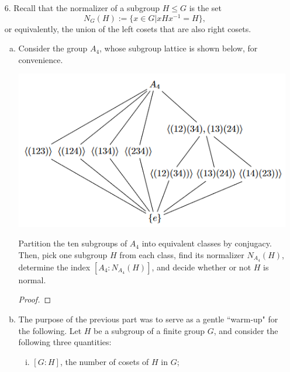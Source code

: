 \begin{itemize}
\begin{enumerate}[(a)]
\begin{enumerate}[(i)]
\begin{proof}
        \end{proof}
    \end{enumerate}
\end{enumerate}












\item[6.] Recall that the normalizer of a subgroup $H \leq G$ is the set
$$N_{G}(H) := \{x \in G | xHx^{-1} = H\},$$
or equivalently, the union of the left cosets that are also right cosets.
\begin{enumerate}[(a)]
\item Consider the group $A_4$, whose subgroup lattice is shown below, for
convenience.
\begin{center}
    \includegraphics[scale=0.5]{A4.png}
\end{center}

Partition the ten subgroups of $A_4$ into equivalent classes by conjugacy. Then,
pick one subgroup $H$ from each class, find its normalizer $N_{A_4}(H)$, determine the index $[A_4 : N_{A_4}(H)]$, and decide whether or not $H$ is normal.
\begin{proof}

\end{proof}

\item The purpose of the previous part was to serve as a gentle ``warm-up"
for the following. Let $H$ be a subgroup of a finite group $G$, and consider the
following three quantities:
    \begin{enumerate}[(i)]
        \item $[G : H]$, the number of cosets of $H$ in $G$;
        

\end{enumerate}
\end{enumerate}
\end{itemize}
